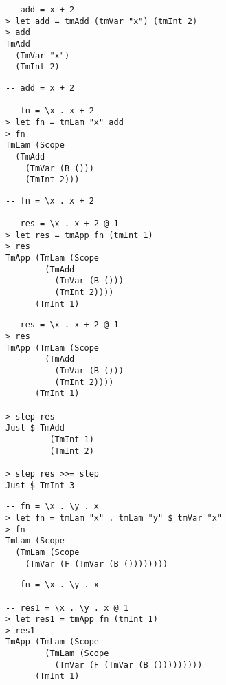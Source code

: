 \begin{frame}[fragile]
\begin{verbatim}
-- add = x + 2
> let add = tmAdd (tmVar "x") (tmInt 2)
> add
TmAdd 
  (TmVar "x") 
  (TmInt 2)
\end{verbatim}
\end{frame}

\begin{frame}[fragile]
\begin{verbatim}
-- add = x + 2

-- fn = \x . x + 2
> let fn = tmLam "x" add
> fn
TmLam (Scope 
  (TmAdd 
    (TmVar (B ())) 
    (TmInt 2)))
\end{verbatim}
\end{frame}

\begin{frame}[fragile]
\begin{verbatim}
-- fn = \x . x + 2

-- res = \x . x + 2 @ 1
> let res = tmApp fn (tmInt 1)
> res
TmApp (TmLam (Scope 
        (TmAdd 
          (TmVar (B ())) 
          (TmInt 2)))) 
      (TmInt 1)
\end{verbatim}
\end{frame}

\begin{frame}[fragile]
\begin{verbatim}
-- res = \x . x + 2 @ 1
> res
TmApp (TmLam (Scope 
        (TmAdd 
          (TmVar (B ())) 
          (TmInt 2)))) 
      (TmInt 1)

> step res
Just $ TmAdd 
         (TmInt 1) 
         (TmInt 2)

> step res >>= step
Just $ TmInt 3
\end{verbatim}
\end{frame}

\begin{frame}[fragile]
\begin{verbatim}
-- fn = \x . \y . x
> let fn = tmLam "x" . tmLam "y" $ tmVar "x" 
> fn
TmLam (Scope 
  (TmLam (Scope 
    (TmVar (F (TmVar (B ())))))))
\end{verbatim}
\end{frame}

\begin{frame}[fragile]
\begin{verbatim}
-- fn = \x . \y . x

-- res1 = \x . \y . x @ 1
> let res1 = tmApp fn (tmInt 1)
> res1
TmApp (TmLam (Scope 
        (TmLam (Scope 
          (TmVar (F (TmVar (B ())))))))) 
      (TmInt 1)
\end{verbatim}
\end{frame}


